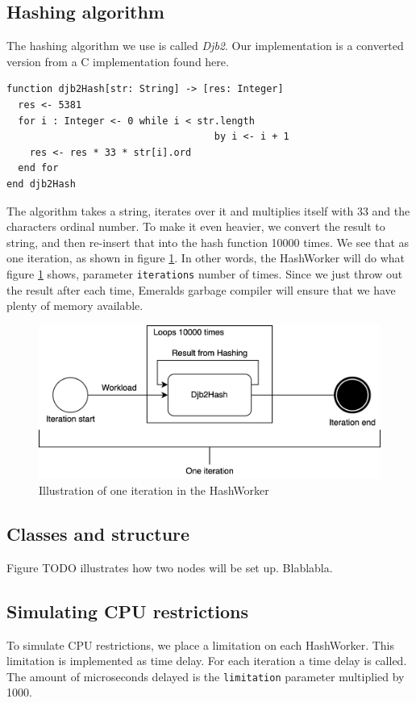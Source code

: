 \subsection{Hashing algorithm}
The hashing algorithm we use is called \textit{Djb2}. Our implementation is a converted version from a C implementation found here\cite{noauthor_hash_nodate}.
\begin{lstlisting}[language=emerald]
function djb2Hash[str: String] -> [res: Integer]
  res <- 5381
  for i : Integer <- 0 while i < str.length 
                                    by i <- i + 1
    res <- res * 33 * str[i].ord
  end for
end djb2Hash
\end{lstlisting}
The algorithm takes a string, iterates over it and multiplies itself with 33 and the characters ordinal number. To make it even heavier, we convert the result to string, and then re-insert that into the hash function 10000 times. We see that as one iteration, as shown in figure \ref{fig:Hashing_algorithm_iteration}. In other words, the HashWorker will do what figure \ref{fig:Hashing_algorithm_iteration} shows, parameter \verb|iterations| number of times. Since we just throw out the result after each time, Emeralds garbage compiler will ensure that we have plenty of memory available. 
\begin{figure}[t]
    \centering
    \includegraphics[scale=0.9]{chapters/implementation/figures/Iteration.png}
    \caption{Illustration of one iteration in the HashWorker}
    \label{fig:Hashing_algorithm_iteration}
\end{figure}




\subsection{Classes and structure}
Figure TODO illustrates how two nodes will be set up. Blablabla.


\subsection{Simulating CPU restrictions}
To simulate CPU restrictions, we place a limitation on each HashWorker. This limitation is implemented as time delay. For each iteration a time delay is called. The amount of microseconds delayed is the \verb|limitation| parameter multiplied by 1000. 

